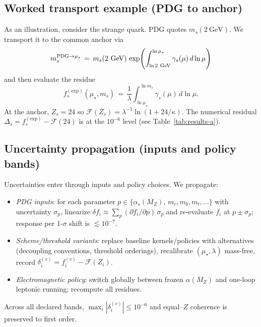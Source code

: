 \documentclass[aps,prd,onecolumn,amsmath,amssymb,superscriptaddress,nofootinbib,showpacs,showkeys]{revtex4-2}
\begin{document}
\subsection{Worked transport example (PDG to anchor)}
As an illustration, consider the strange quark. PDG quotes $m_s(2~\mathrm{GeV})$. We transport it to the common anchor via
\begin{equation}
  m_s^{\rm PDG\to\mu_\star}
  \,=\, m_s(2~\mathrm{GeV})\,\exp\!{\Biggl(\int_{\ln 2~\mathrm{GeV}}^{\ln\mu_\star}\gamma_s(\mu)\,d\ln\mu\Biggr)}
\end{equation}
and then evaluate the residue
\begin{equation}
  f_s^{\mathrm{(exp)}}(\mu_\star,m_s)
  \,=\, \frac{1}{\lambda}\int_{\ln\mu_\star}^{\ln m_s}\!\gamma_s(\mu)\,d\ln\mu.
\end{equation}
At the anchor, $Z_s=24$ so $\mathcal F(Z_s)=\lambda^{-1}\ln(1+24/\kappa)$. The numerical residual $\Delta_s=f_s^{\mathrm{(exp)}}-\mathcal F(24)$ is at the $10^{-6}$ level (see Table~\ref{tab:results-a}).

\subsection{Uncertainty propagation (inputs and policy bands)}
Uncertainties enter through inputs and policy choices. We propagate:
\begin{itemize}
  \item \emph{PDG inputs}: for each parameter $p\in\{\alpha_s(M_Z),\,m_c,m_b,m_t,\ldots\}$ with uncertainty $\sigma_p$, linearize $\delta f_i\approx\sum_p(\partial f_i/\partial p)\,\sigma_p$ and re-evaluate $f_i$ at $p\pm\sigma_p$; response per 1-$\sigma$ shift is $\lesssim 10^{-7}$.
  \item \emph{Scheme/threshold variants}: replace baseline kernels/policies with alternatives (decoupling conventions, threshold orderings), recalibrate $(\mu_\star,\lambda)$ mass-free, record $\delta_i^{(v)}=f_i^{(v)}-\mathcal F(Z_i)$.
  \item \emph{Electromagnetic policy}: switch globally between frozen $\alpha(M_Z)$ and one-loop leptonic running; recompute all residues.
\end{itemize}
Across all declared bands, $\max_i|\delta_i^{(v)}|\le 10^{-6}$ and equal–$Z$ coherence is preserved to first order.
\end{document}
